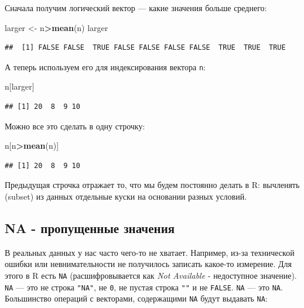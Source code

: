 \documentclass[]{book}
\newenvironment{Shaded}{\begin{snugshade}}{\end{snugshade}}
\newcommand{\KeywordTok}[1]{\textcolor[rgb]{0.13,0.29,0.53}{\textbf{#1}}}
\newcommand{\StringTok}[1]{\textcolor[rgb]{0.31,0.60,0.02}{#1}}
\newcommand{\OperatorTok}[1]{\textcolor[rgb]{0.81,0.36,0.00}{\textbf{#1}}}
\newcommand{\NormalTok}[1]{#1}
\begin{document}
Сначала получим логический вектор --- какие значения больше среднего:

\begin{Shaded}
\begin{Highlighting}[]
\NormalTok{larger <-}\StringTok{ }\NormalTok{n}\OperatorTok{>}\KeywordTok{mean}\NormalTok{(n)}
\NormalTok{larger}
\end{Highlighting}
\end{Shaded}

\begin{verbatim}
##  [1] FALSE FALSE  TRUE FALSE FALSE FALSE FALSE  TRUE  TRUE  TRUE
\end{verbatim}

А теперь используем его для индексирования вектора \texttt{n}:

\begin{Shaded}
\begin{Highlighting}[]
\NormalTok{n[larger]}
\end{Highlighting}
\end{Shaded}

\begin{verbatim}
## [1] 20  8  9 10
\end{verbatim}

Можно все это сделать в одну строчку:

\begin{Shaded}
\begin{Highlighting}[]
\NormalTok{n[n}\OperatorTok{>}\KeywordTok{mean}\NormalTok{(n)]}
\end{Highlighting}
\end{Shaded}

\begin{verbatim}
## [1] 20  8  9 10
\end{verbatim}

Предыдущая строчка отражает то, что мы будем постоянно делать в R:
вычленять (subset) из данных отдельные куски на основании разных
условий.

\subsection{NA - пропущенные значения}\label{na}

В реальных данных у нас часто чего-то не хватает. Например, из-за
технической ошибки или невнимательности не получилось записать какое-то
измерение. Для этого в R есть \texttt{NA} (расшифровывается как
\emph{Not Available} - недоступное значение). \texttt{NA} --- это не
строка \texttt{"NA"}, не \texttt{0}, не пустая строка \texttt{""} и не
\texttt{FALSE}. \texttt{NA} --- это \texttt{NA}. Большинство операций с
векторами, содержащими \texttt{NA} будут выдавать \texttt{NA}:
\end{document}
